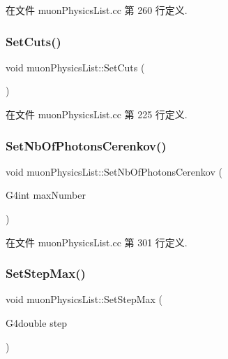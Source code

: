 在文件 muon\+Physics\+List.\+cc 第 260 行定义.

\mbox{\label{classmuonPhysicsList_ae567a51ca4aff57c7148bb3886bff6d0}} 
\subsubsection{\texorpdfstring{Set\+Cuts()}{SetCuts()}}
{\footnotesize\ttfamily void muon\+Physics\+List\+::\+Set\+Cuts (\begin{DoxyParamCaption}{ }\end{DoxyParamCaption})}



在文件 muon\+Physics\+List.\+cc 第 225 行定义.

\mbox{\label{classmuonPhysicsList_abf3b923807c3112086ea15a698d5666b}} 
\subsubsection{\texorpdfstring{Set\+Nb\+Of\+Photons\+Cerenkov()}{SetNbOfPhotonsCerenkov()}}
{\footnotesize\ttfamily void muon\+Physics\+List\+::\+Set\+Nb\+Of\+Photons\+Cerenkov (\begin{DoxyParamCaption}\item[{G4int}]{max\+Number }\end{DoxyParamCaption})}



在文件 muon\+Physics\+List.\+cc 第 301 行定义.

\mbox{\label{classmuonPhysicsList_a43f30e66e8518d33040777262bbc829f}} 
\subsubsection{\texorpdfstring{Set\+Step\+Max()}{SetStepMax()}}
{\footnotesize\ttfamily void muon\+Physics\+List\+::\+Set\+Step\+Max (\begin{DoxyParamCaption}\item[{G4double}]{step }\end{DoxyParamCaption})}



